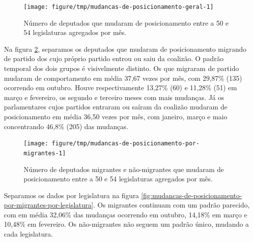 \documentclass[a4paper,titlepage]{ppgi}\usepackage[]{graphicx}\usepackage[]{color}
\newenvironment{knitrout}{}{} %
\begin{document}
\begin{knitrout}
\color{fgcolor}\begin{figure}
\texttt{[image: figure/tmp/mudancas-de-posicionamento-geral-1]} \caption[Número de deputados que mudaram de posicionamento entre a 50\textordfeminine{} e 54\textordfeminine{} legislaturas agregados por mês]{Número de deputados que mudaram de posicionamento entre a 50\textordfeminine{} e 54\textordfeminine{} legislaturas agregados por mês.}\label{fig:mudancas-de-posicionamento-geral}
\end{figure}


\end{knitrout}

Na figura \ref{fig:mudancas-de-posicionamento-por-migrantes}, separamos os
deputados que mudaram de posicionamento migrando de partido dos cujo próprio
partido entrou ou saiu da coalizão. O padrão temporal dos dois grupos é
visivelmente distinto. Os que migraram de partido mudaram de comportamento em
média 37,67 vezes por mês, com
29,87\%
(135) ocorrendo em outubro. Houve respectivamente
13,27\%
(60) e
11,28\%
(51) em março e fevereiro, os segundo e terceiro
meses com mais mudanças. Já os parlamentares cujos partidos entraram ou saíram
da coalizão mudaram de posicionamento em média
36,50 vezes por mês, com janeiro, março e
maio concentrando
46,8\%
(205) das mudanças.

\begin{knitrout}
\color{fgcolor}\begin{figure}
\texttt{[image: figure/tmp/mudancas-de-posicionamento-por-migrantes-1]} \caption[Número de deputados migrantes e não-migrantes que mudaram de posicionamento entre a 50\textordfeminine{} e 54\textordfeminine{} legislaturas agregados por mês]{Número de deputados migrantes e não-migrantes que mudaram de posicionamento entre a 50\textordfeminine{} e 54\textordfeminine{} legislaturas agregados por mês.}\label{fig:mudancas-de-posicionamento-por-migrantes}
\end{figure}


\end{knitrout}

Separamos os dados por legislatura na figura
\ref{fig:mudancas-de-posicionamento-por-migrantes-por-legislatura}. Os
migrantes continuam com um padrão parecido, com em média
32,06\%
das mudanças ocorrendo em outubro,
14,18\%
em março e
10,48\%
em fevereiro. Os não-migrantes não seguem um padrão único, mudando a cada
legislatura.
\end{document}
